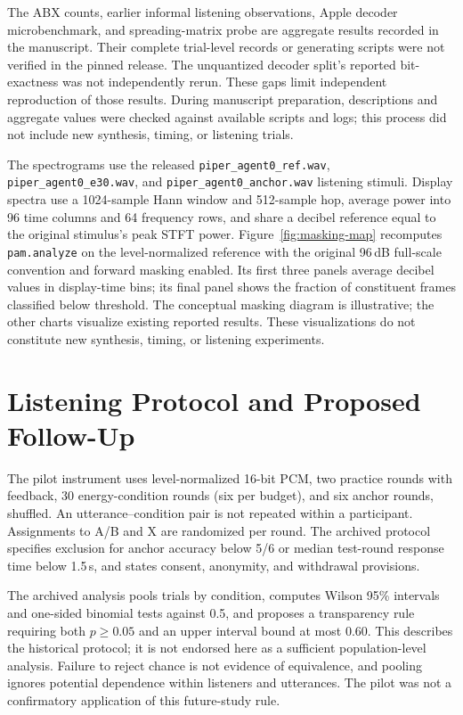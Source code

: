 \documentclass[11pt,a4paper]{article}
\begin{document}
The ABX counts, earlier informal listening observations, Apple decoder microbenchmark, and spreading-matrix probe are aggregate results recorded in the manuscript. Their complete trial-level records or generating scripts were not verified in the pinned release. The unquantized decoder split's reported bit-exactness was not independently rerun. These gaps limit independent reproduction of those results. During manuscript preparation, descriptions and aggregate values were checked against available scripts and logs; this process did not include new synthesis, timing, or listening trials.

The spectrograms use the released \texttt{piper\_agent0\_ref.wav}, \texttt{piper\_agent0\_e30.wav}, and \texttt{piper\_agent0\_anchor.wav} listening stimuli. Display spectra use a 1024-sample Hann window and 512-sample hop, average power into 96 time columns and 64 frequency rows, and share a decibel reference equal to the original stimulus's peak STFT power. Figure~\ref{fig:masking-map} recomputes \texttt{pam.analyze} on the level-normalized reference with the original 96\,dB full-scale convention and forward masking enabled. Its first three panels average decibel values in display-time bins; its final panel shows the fraction of constituent frames classified below threshold. The conceptual masking diagram is illustrative; the other charts visualize existing reported results. These visualizations do not constitute new synthesis, timing, or listening experiments.

\section{Listening Protocol and Proposed Follow-Up}
\label{app:abx}
The pilot instrument uses level-normalized 16-bit PCM, two practice rounds with feedback, 30 energy-condition rounds (six per budget), and six anchor rounds, shuffled. An utterance--condition pair is not repeated within a participant. Assignments to A/B and X are randomized per round. The archived protocol specifies exclusion for anchor accuracy below 5/6 or median test-round response time below 1.5\,s, and states consent, anonymity, and withdrawal provisions.

The archived analysis pools trials by condition, computes Wilson 95\% intervals and one-sided binomial tests against 0.5, and proposes a transparency rule requiring both $p\geq0.05$ and an upper interval bound at most 0.60. This describes the historical protocol; it is not endorsed here as a sufficient population-level analysis. Failure to reject chance is not evidence of equivalence, and pooling ignores potential dependence within listeners and utterances. The pilot was not a confirmatory application of this future-study rule.
\end{document}
